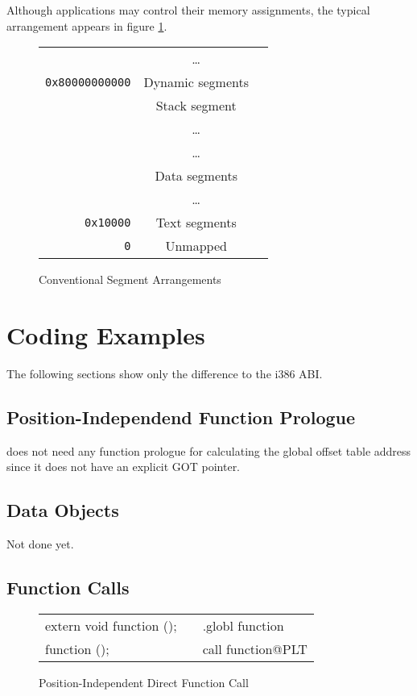 Although applications may control their memory assignments, the typical
arrangement appears in figure \ref{fig-cfg}.

\begin{figure}[H]
\Hrule
  \caption{Conventional Segment Arrangements}
  \label{fig-cfg}
  \begin{center}
    \begin{tabular}{r|c|l}
      \cline{2-2}
      & \dots & \\
      \verb|0x80000000000| & Dynamic segments & \\ \cline{2-2}
      & Stack segment & \\ 
      & \dots & \\ \cline{2-2}
      & \dots & \\
      & Data segments & \\ \cline{2-2}
      & \dots & \\
      \verb|0x10000| & Text segments & \\ \cline{2-2}
      \verb|0| & Unmapped & \\ \cline{2-2}
    \end{tabular}
  \end{center}
\Hrule
\end{figure}

\section{Coding Examples}

The following sections show only the difference to the i386 ABI.

\subsection{Position-Independend Function Prologue}

\xARCH does not need any function prologue for calculating the global
offset table address since it does not have an explicit GOT pointer.

\subsection{Data Objects}

Not done yet.

\subsection{Function Calls}

\begin{figure}[H]
\Hrule
\caption{Position-Independent Direct Function Call}
\begin{center}
\begin{tabular}{|l|c|l|}
\cline{1-1}\cline{3-3}
extern void function ();  &&.globl function\\
function ();              &&call function@PLT\\
\cline{1-1}\cline{3-3}
\end{tabular}
\end{center}
\Hrule
\end{figure}

